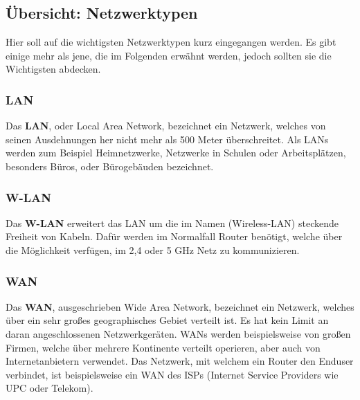 \documentclass[12pt,a4paper]{report}
\begin{document}
\begin{onehalfspace}
\subsection{Übersicht: Netzwerktypen}
Hier soll auf die wichtigsten Netzwerktypen kurz eingegangen werden. Es gibt einige mehr als jene, die im Folgenden erwähnt werden, jedoch sollten sie die Wichtigsten abdecken.
\subsubsection{LAN}
Das \textbf{LAN}, oder Local Area Network, bezeichnet ein Netzwerk, welches von seinen Ausdehnungen her nicht mehr als 500 Meter überschreitet. Als LANs werden zum Beispiel Heimnetzwerke, Netzwerke in Schulen oder Arbeitsplätzen, besonders Büros, oder Bürogebäuden bezeichnet.
\subsubsection{W-LAN}
Das \textbf{W-LAN} erweitert das LAN um die im Namen (Wireless-LAN) steckende Freiheit von Kabeln. Dafür werden im Normalfall Router benötigt, welche über die Möglichkeit verfügen, im 2,4 oder 5 GHz Netz zu kommunizieren.
\subsubsection{WAN}
Das \textbf{WAN}, ausgeschrieben Wide Area Network, bezeichnet ein Netzwerk, welches über ein sehr großes geographisches Gebiet verteilt ist. Es hat kein Limit an daran angeschlossenen Netzwerkgeräten. WANs werden beispielsweise von großen Firmen, welche über mehrere Kontinente verteilt operieren, aber auch von Internetanbietern verwendet. Das Netzwerk, mit welchem ein Router den Enduser verbindet, ist beispielsweise ein WAN des ISPs (Internet Service Providers wie UPC oder Telekom). 

\end{onehalfspace}
\end{document}

